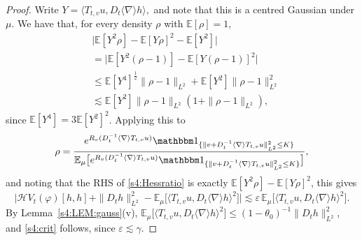 \documentclass[10pt,a4paper]{amsart}
\theoremstyle{plain}
\theoremstyle{definition}
\theoremstyle{remark}
\renewcommand{\H}{\mathcal H}
\newcommand{\E}{\mathbb{E}}
\newcommand{\nb}{\nabla}
\newcommand{\ep}{\varepsilon}
\newcommand{\les}{\lesssim}
\newcommand{\jb}[1]
{\langle #1 \rangle}
\newcommand{\ind}{\mathbbm 1}
\newcommand{\ph}{\varphi}
\newcommand{\eps}{\ep}
\newcommand{\RT}{R_v(D_t^{-1}\jb\nb T_{t,v}u)}
\newcommand{\IT}{\ind_{\{\|v+D_t^{-1}\jb\nb T_{t,v}u\|_{L^2}^2\le K\}}}
\begin{document}
\begin{proof}
Write  $Y = \jb{T_{t,v}u,D_t\jb\nb h},$ and note that this is a centred Gaussian under $\mu$. We have that, for every density $\rho$ with $\E[\rho]=1,$
\begin{align*}
    &\big|\E[Y^2 \rho] - \E[Y\rho]^2 - \E[Y^2]\big| \\
    &= \big|\E[Y^2 (\rho-1)] - \E[Y(\rho-1)]^2\big| \\
    &\le \E[Y^4]^\frac12 \|\rho-1\|_{L^2} + \E[Y^2] \|\rho-1\|_{L^2}^2 \\
    &\les \E[Y^2]\|\rho-1\|_{L^2}(1 + \|\rho-1\|_{L^2}),
\end{align*}
since $\E[Y^4]=3\E[Y^2]^2$.
Applying this to
$$ \rho = \frac{e^{\RT}\IT}{\E_\mu\big[e^{\RT}\IT\big]},$$
and noting that the RHS of \eqref{s4:Hessratio} is exactly $\E[Y^2 \rho] - \E[Y\rho]^2$,
this gives
\[
\Big|\H V_t(\ph)[h,h]+\|D_th\|_{L^2}^2-\E_\mu\big[\jb{T_{t,v}u,D_t\jb\nb h}^2\big]\Big|
\les\eps\,\E_\mu\big[\jb{T_{t,v}u,D_t\jb\nb h}^2\big].
\]
By Lemma~\ref{s4:LEM:gauss}(v), $\E_\mu\big[\jb{T_{t,v}u,D_t\jb\nb h}^2\big]\le(1-\theta_0)^{-1}\|D_th\|_{L^2}^2$,
 and \eqref{s4:crit} follows, since $\eps\les\gamma$.
\end{proof}
\end{document}
